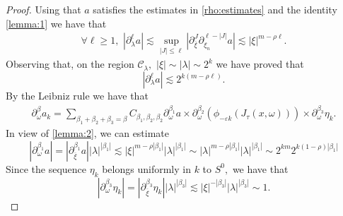 \documentclass[12pt, reqno]{amsart}
\theoremstyle{definition}
\theoremstyle{remark}
\numberwithin{equation}{section}
\begin{document}
\begin{proof} Using that
 $a$ satisfies the estimates in \eqref{rho:estimates} and the identity \eqref{lemma:1}  we have that
\begin{align*}
 \forall \ell\geq 1,\,\,   |\partial_\lambda^\ell a|\lesssim \sup_{|J|\leq \ell}|\partial_{\overline{\xi}}^{J}\partial_{\xi_n}^{\ell-|J|}a|\lesssim |\xi|^{m-\rho \ell}.
\end{align*}Observing that, on the region $\mathscr{C}_\lambda,$ $|\xi|\sim |\lambda|\sim 2^{k}$ we have proved that
\begin{equation}
    |\partial_\lambda^\ell a|\lesssim 2^{k(m-\rho \ell) }.
\end{equation}
By the Leibniz rule we have that
\begin{align}\label{Leibniz}
    \partial_\omega^\beta a_k=\sum_{\beta_1+\beta_2+\beta_3=\beta}C_{\beta_1,\beta_2,\beta_2}  \partial_\omega^{\beta_1} a\times \partial_\omega^{\beta_2}(\phi_{-\varepsilon k}(J_{\tau}(x,\omega)))\times \partial_\omega^{\beta_3} \eta_k.
\end{align}In view of \eqref{lemma:2},
we can estimate
\begin{equation}
    |\partial_\omega^{\beta_1} a|=|\partial_{\overline{\xi}}^{\beta_1} a||\lambda|^{|\beta_1|}\lesssim |\xi|^{m-\rho|\beta_1|}|\lambda|^{|\beta_1|}\sim  |\lambda|^{m-\rho|\beta_1|}|\lambda|^{|\beta_1|}\sim 2^{km}2^{k(1-\rho)|\beta_1|}
\end{equation}Since the sequence $\eta_k$ belongs uniformly  in $k$ to $S^0,$ we have that 
\begin{equation}
    |\partial_\omega^{\beta_3} \eta_k|=|\partial_{\overline{\xi}}^{\beta_3} \eta_k||\lambda|^{|\beta_3|}\lesssim |\xi|^{-|\beta_3|}|\lambda|^{|\beta_3|}\sim 1.
\end{equation} 


\end{proof}
\end{document}
